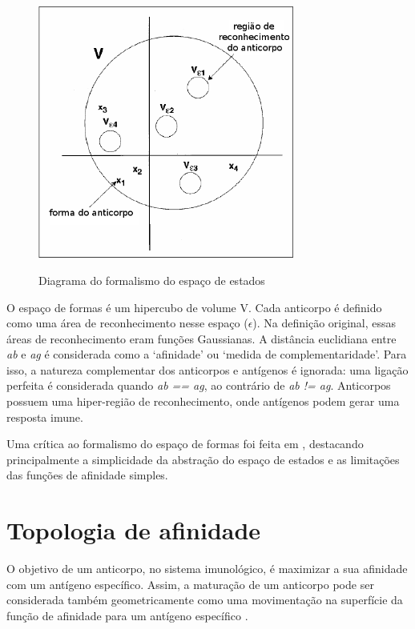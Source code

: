 \begin{figure}[h!]
    \vspace{1cm}
    \centering
    \includegraphics[width=0.75\textwidth]{img/space.png}
    \label{img:space}
    \caption{Diagrama do formalismo do espaço de estados \cite{Brownlee2007}}
    \vspace{1cm}
\end{figure}

O espaço de formas é um hipercubo de volume V. Cada anticorpo é definido como uma área de reconhecimento nesse espaço ($\epsilon$). Na definição original, essas áreas de reconhecimento eram funções Gaussianas. A distância euclidiana entre \emph{ab} e \emph{ag} é considerada como a `afinidade' ou `medida de complementaridade'. Para isso, a natureza complementar dos anticorpos e antígenos é ignorada: uma ligação perfeita é considerada quando \emph{ab == ag}, ao contrário de \emph{ab != ag}. Anticorpos possuem uma hiper-região de reconhecimento, onde antígenos podem gerar uma resposta imune.

Uma crítica ao formalismo do espaço de formas foi feita em \citet{Carneiro1994}, destacando principalmente a simplicidade da abstração do espaço de estados e as limitações das funções de afinidade simples.

\section{Topologia de afinidade}

O objetivo de um anticorpo, no sistema imunológico, é maximizar a sua afinidade com um antígeno específico. Assim, a maturação de um anticorpo pode ser considerada também geometricamente como uma movimentação na superfície da função de afinidade para um antígeno específico \cite{Brownlee2007}.

